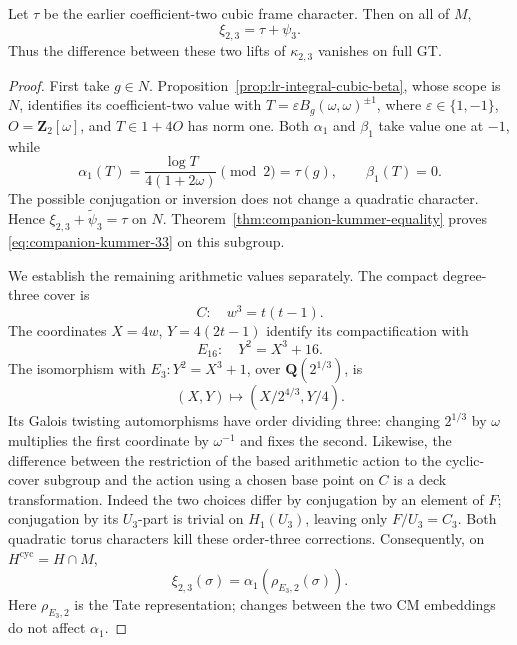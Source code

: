 \begin{corollary}\label{cor:cubic-two-lifts-equal}
Let \(\tau\) be the earlier coefficient-two cubic frame character.
Then on all of \(M\),
\begin{equation}
                         \xi_{2,3}=\tau+\psi_3.
\label{eq:companion-kummer-33}
\end{equation}
Thus the difference between these two lifts of \(\kappa_{2,3}\)
vanishes on full GT.
\end{corollary}

\begin{proof}
First take \(g\in N\). Proposition~\ref{prop:lr-integral-cubic-beta},
whose scope is \(N\), identifies its coefficient-two
value with
\(T=\varepsilon B_g(\omega,\omega)^{\pm1}\), where
\(\varepsilon\in\{1,-1\}\), \(O=\mathbf Z_2[\omega]\), and
\(T\in1+4O\) has norm one. Both \(\alpha_1\) and \(\beta_1\)
take value one at \(-1\), while
\[
 \alpha_1(T)=\frac{\log T}{4(1+2\omega)}\pmod2=\tau(g),
                     \qquad \beta_1(T)=0.
\]
The possible conjugation or inversion does not change a quadratic
character. Hence \(\xi_{2,3}+\widetilde\psi_3=\tau\) on \(N\).
Theorem~\ref{thm:companion-kummer-equality} proves \eqref{eq:companion-kummer-33} on this subgroup.

We establish the remaining arithmetic values separately. The
compact degree-three cover is
\[
                    C:\quad w^3=t(t-1).
\]
The coordinates \(X=4w\), \(Y=4(2t-1)\) identify its
compactification with
\[
                    E_{16}:\quad Y^2=X^3+16.
\]
The isomorphism with \(E_3:Y^2=X^3+1\), over
\(\mathbf Q(2^{1/3})\), is
\[
                 (X,Y)\longmapsto
                    (X/2^{4/3},Y/4).
\]
Its Galois twisting automorphisms have order dividing three:
changing \(2^{1/3}\) by \(\omega\) multiplies the first
coordinate by \(\omega^{-1}\) and fixes the second.
Likewise, the difference between the restriction of the based
arithmetic action to the cyclic-cover subgroup and the action
using a chosen base point on \(C\) is a deck transformation.
Indeed the two choices differ by conjugation by an element of
\(F\); conjugation by its \(U_3\)-part is trivial on
\(H_1(U_3)\), leaving only \(F/U_3=C_3\).
Both quadratic torus characters kill these order-three
corrections. Consequently, on
\(H^{\mathrm{cyc}}=H\cap M\),
\[
             \xi_{2,3}(\sigma)
                    =\alpha_1(\rho_{E_3,2}(\sigma)).
\]
Here \(\rho_{E_3,2}\) is the Tate representation;
changes between the two CM embeddings do not affect \(\alpha_1\).


\end{proof}
